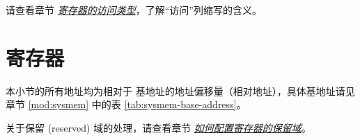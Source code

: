 \documentclass[main\_\_CN.tex]{subfiles}
\begin{document}
请查看章节 \hyperref[glossary-access-types]{\textit{寄存器的访问类型}}，了解“访问”列缩写的含义。





\newpage
\section{寄存器}


本小节的所有地址均为相对于 \modulename{} 基地址的地址偏移量（相对地址），具体基地址请见章节 \ref{mod:sysmem} \textit{} 中的表 \ref{tab:sysmem-base-address}。

关于保留 (reserved) 域的处理，请查看章节 \hyperref[programming-reserved-field]{\textit{如何配置寄存器的保留域}}。




\end{document}
